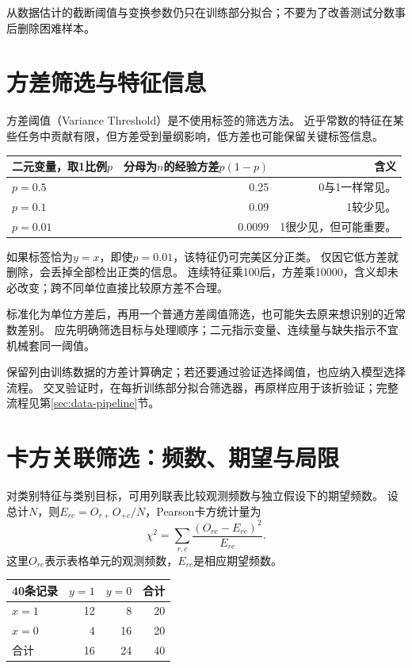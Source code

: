从数据估计的截断阈值与变换参数仍只在训练部分拟合；不要为了改善测试分数事后删除困难样本。

\section{方差筛选与特征信息}
\label{sec:reliability-variance}
方差阈值（Variance Threshold）是不使用标签的筛选方法。
近乎常数的特征在某些任务中贡献有限，但方差受到量纲影响，低方差也可能保留关键标签信息。

\begin{center}
\begin{tabular}{lrr}
\toprule
二元变量，取1比例$p$ & 分母为$n$的经验方差$p(1-p)$ & 含义\\
\midrule
$p=0.5$ & 0.25 & 0与1一样常见。\\
$p=0.1$ & 0.09 & 1较少见。\\
$p=0.01$ & 0.0099 & 1很少见，但可能重要。\\
\bottomrule
\end{tabular}
\end{center}

如果标签恰为$y=x$，即使$p=0.01$，该特征仍可完美区分正类。
仅因它低方差就删除，会丢掉全部检出正类的信息。
连续特征乘100后，方差乘10000，含义却未必改变；跨不同单位直接比较原方差不合理。

标准化为单位方差后，再用一个普通方差阈值筛选，也可能失去原来想识别的近常数差别。
应先明确筛选目标与处理顺序；二元指示变量、连续量与缺失指示不宜机械套同一阈值。

保留列由训练数据的方差计算确定；若还要通过验证选择阈值，也应纳入模型选择流程。
交叉验证时，在每折训练部分拟合筛选器，再原样应用于该折验证；完整流程见第\ref{sec:data-pipeline}节。

\section{卡方关联筛选：频数、期望与局限}
\label{sec:reliability-chi2}
对类别特征与类别目标，可用列联表比较观测频数与独立假设下的期望频数。
设总计$N$，则$E_{rc}=O_{r+}O_{+c}/N$，Pearson卡方统计量为
\[
 \chi^2=\sum_{r,c}\frac{(O_{rc}-E_{rc})^2}{E_{rc}}.
\]
这里$O_{rc}$表示表格单元的观测频数，$E_{rc}$是相应期望频数。

\begin{center}
\begin{tabular}{lrrr}
\toprule
40条记录 & $y=1$ & $y=0$ & 合计\\
\midrule
$x=1$ & 12 & 8 & 20\\
$x=0$ & 4 & 16 & 20\\
\midrule
合计 & 16 & 24 & 40\\
\bottomrule
\end{tabular}
\end{center}

